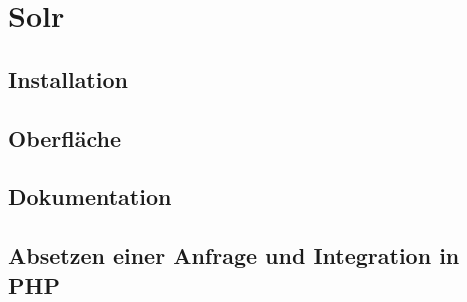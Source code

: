 
\chapter{Solr}

\section{Installation}

\section{Oberfläche}

\section{Dokumentation}

\section{Absetzen einer Anfrage und Integration in PHP}